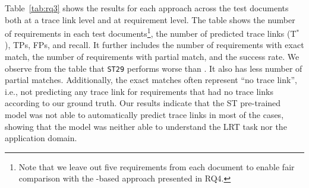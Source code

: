 
% 


Table~\ref{tab:rq3} shows the results for each approach across the test documents both at a trace link level and at requirement level. The table shows the number of requirements in each test documents\footnote{Note that we leave out five requirements from each document to enable fair comparison with the \RICE-based approach presented in RQ4.}, the number of predicted trace links (T$^*$), TPs, FPs, and recall. It further includes 
the number of requirements with exact match, the number of requirements with partial match, and the success rate. 
We observe from the table that \texttt{ST29} performs worse than \kashif. It also has less number of partial matches. Additionally, the exact matches often represent ``no trace link'', i.e., not predicting any trace link for requirements that had no trace links according to our ground truth. Our results indicate that the ST pre-trained model was not able to automatically predict trace links in most of the cases, showing that the model was neither able to understand the LRT task nor the application domain. 

